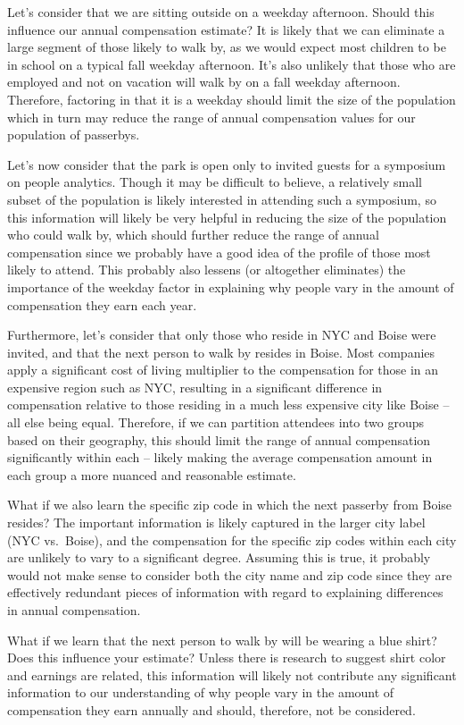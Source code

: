\documentclass[]{book}
\begin{document}
Let's consider that we are sitting outside on a weekday afternoon. Should this influence our annual compensation estimate? It is likely that we can eliminate a large segment of those likely to walk by, as we would expect most children to be in school on a typical fall weekday afternoon. It's also unlikely that those who are employed and not on vacation will walk by on a fall weekday afternoon. Therefore, factoring in that it is a weekday should limit the size of the population which in turn may reduce the range of annual compensation values for our population of passerbys.

Let's now consider that the park is open only to invited guests for a symposium on people analytics. Though it may be difficult to believe, a relatively small subset of the population is likely interested in attending such a symposium, so this information will likely be very helpful in reducing the size of the population who could walk by, which should further reduce the range of annual compensation since we probably have a good idea of the profile of those most likely to attend. This probably also lessens (or altogether eliminates) the importance of the weekday factor in explaining why people vary in the amount of compensation they earn each year.

Furthermore, let's consider that only those who reside in NYC and Boise were invited, and that the next person to walk by resides in Boise. Most companies apply a significant cost of living multiplier to the compensation for those in an expensive region such as NYC, resulting in a significant difference in compensation relative to those residing in a much less expensive city like Boise -- all else being equal. Therefore, if we can partition attendees into two groups based on their geography, this should limit the range of annual compensation significantly within each -- likely making the average compensation amount in each group a more nuanced and reasonable estimate.

What if we also learn the specific zip code in which the next passerby from Boise resides? The important information is likely captured in the larger city label (NYC vs.~Boise), and the compensation for the specific zip codes within each city are unlikely to vary to a significant degree. Assuming this is true, it probably would not make sense to consider both the city name and zip code since they are effectively redundant pieces of information with regard to explaining differences in annual compensation.

What if we learn that the next person to walk by will be wearing a blue shirt? Does this influence your estimate? Unless there is research to suggest shirt color and earnings are related, this information will likely not contribute any significant information to our understanding of why people vary in the amount of compensation they earn annually and should, therefore, not be considered.
\end{document}
